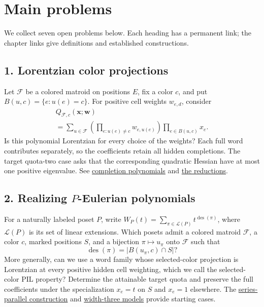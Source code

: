\section[mainProblems]{Main problems}

We collect seven open problems below. Each heading has a permanent link;
the chapter links give definitions and established constructions.

\subsection[problem1]{1. Lorentzian color projections}

Let $\mathcal F$ be a colored matroid on positions $E$, fix a color $c$,
and put $B(u,c)=\{e:u(e)=c\}$. For positive cell weights $w_{e,d}$, consider
\[
 \begin{gathered}
 Q_{\mathcal F,c}(\mathbf x;\mathbf w)\\
 =\sum_{u\in\mathcal F}
   \left(\prod_{e:u(e)\ne c}w_{e,u(e)}\right)
   \prod_{e\in B(u,c)}x_e.
 \end{gathered}
\]
Is this polynomial Lorentzian for every choice of the weights?
Each full word contributes separately, so the coefficients retain all
hidden completions. The target quota-two case asks that the corresponding
quadratic Hessian have at most one positive eigenvalue.
See \href{rank.htm#lorentzianConjecture}{completion polynomials} and
\href{reductions.htm}{the reductions}.

\subsection[problem2]{2. Realizing $P$-Eulerian polynomials}

For a naturally labeled poset $P$, write
$W_P(t)=\sum_{\pi\in\mathcal L(P)}t^{\operatorname{des}(\pi)}$, where
$\mathcal L(P)$ is its set of linear extensions. Which posets admit a
colored matroid $\mathcal F$, a color $c$, marked positions $S$, and a
bijection $\pi\mapsto u_\pi$ onto $\mathcal F$ such that
\[
 \operatorname{des}(\pi)=|B(u_\pi,c)\cap S|?
\]
More generally, can we use a word family whose selected-color projection
is Lorentzian at every positive hidden cell weighting, which we call the
selected-color PIL property? Determine the attainable target quota and
preserve the full coefficients under the specialization $x_e=t$ on $S$
and $x_e=1$ elsewhere. The
\href{series-parallel.htm#seriesParallelLift}{series-parallel construction}
and \href{log-concavity.htm}{width-three models} provide starting cases.

